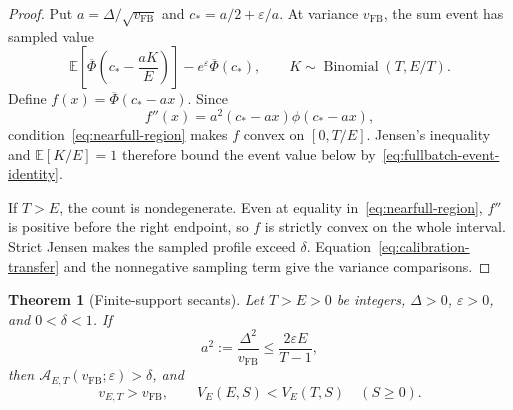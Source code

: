 \documentclass[11pt]{article}
\newtheorem{theorem}{Theorem}[section]
\theoremstyle{remark}
\newcommand{\E}{\mathbb E}
\begin{document}
\begin{proof}
Put $a=\Delta/\sqrt{v_{\mathrm{FB}}}$ and $c_*=a/2+\varepsilon/a$.
At variance $v_{\mathrm{FB}}$, the sum event has sampled value
\[
 \E\left[\overline\Phi\left(c_*-\frac{aK}{E}\right)\right]
 -e^\varepsilon\overline\Phi(c_*),
 \qquad K\sim\operatorname{Binomial}(T,E/T).
\]
Define $f(x)=\overline\Phi(c_*-ax)$. Since
\[
 f''(x)=a^2(c_*-ax)\phi(c_*-ax),
\]
condition~\eqref{eq:nearfull-region} makes $f$ convex on $[0,T/E]$.
Jensen's inequality and $\E[K/E]=1$ therefore bound the event value below
by~\eqref{eq:fullbatch-event-identity}.

If $T>E$, the count is nondegenerate. Even at equality
in~\eqref{eq:nearfull-region}, $f''$ is positive before the right endpoint,
so $f$ is strictly convex on the whole interval. Strict Jensen makes the
sampled profile exceed $\delta$. Equation~\eqref{eq:calibration-transfer}
and the nonnegative sampling term give the variance comparisons.
\end{proof}

\begin{theorem}[Finite-support secants]\label{thm:support-width-accountant}
Let $T>E>0$ be integers, $\Delta>0$, $\varepsilon>0$, and $0<\delta<1$.
If
\begin{equation}\label{eq:support-width-region}
 a^2:=\frac{\Delta^2}{v_{\mathrm{FB}}}
 \leq\frac{2\varepsilon E}{T-1},
\end{equation}
then $\mathcal A_{E,T}(v_{\mathrm{FB}};\varepsilon)>\delta$, and
\[
 v_{E,T}>v_{\mathrm{FB}},\qquad
 V_E(E,S)<V_E(T,S)\quad(S\geq0).
\]
\end{theorem}
\end{document}
